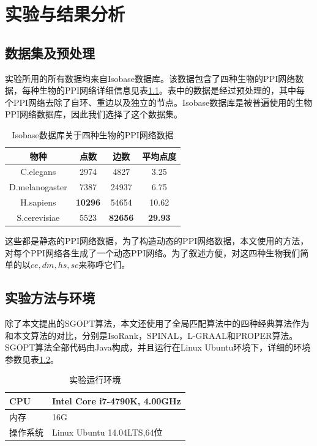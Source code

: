 \chapter{实验与结果分析}

\section{数据集及预处理}
实验所用的所有数据均来自Isobase数据库\cite{park2011isobase}。该数据包含了四种生物的PPI网络数据，每种生物的PPI网络详细信息见表\ref{table:1}。表中的数据是经过预处理的，其中每个PPI网络去除了自环、重边以及独立的节点。Isobase数据库是被普遍使用的生物PPI网络数据库，因此我们选择了这个数据集。


\begin{table}[htbp]
    \centering
    \caption{Isobase数据库关于四种生物的PPI网络数据}
    \label{table:1}
    \begin{tabular}{cccc}
         \hline 物种&点数&边数&平均点度\\
         \hline C.elegans&2974&4827&3.25\\
         D.melanogaster&7387&24937&6.75\\
         H.sapiens&\bf{10296}&54654&10.62\\
         S.cerevisiae&5523&\bf{82656}&\bf{29.93}\\
         \hline
    \end{tabular}
\end{table}

这些都是静态的PPI网络数据，为了构造动态的PPI网络数据，本文使用\cite{zhang2016method}的方法，对每个PPI网络各生成了一个动态PPI网络。为了叙述方便，对这四种生物我们简单的以$ce,dm,hs,sc$来称呼它们。

\section{实验方法与环境}
除了本文提出的SGOPT算法，本文还使用了全局匹配算法中的四种经典算法作为和本文算法的对比，分别是IsoRank\cite{singh2008global}，SPINAL\cite{aladaug2013spinal}，L-GRAAL\cite{malod2015graal}和PROPER\cite{kazemi2016proper}算法。SGOPT算法全部代码由Java构成，并且运行在Linux Ubuntu环境下，详细的环境参数见表\ref{table:2}。

\begin{table}[htbp]
    \centering
    \caption{实验运行环境}
    \label{table:2}
    \begin{tabular}{l|l}
         \hline 
         CPU&Intel Core i7-4790K, 4.00GHz\\
         \hline
         内存&16G\\
         \hline
         操作系统&Linux Ubuntu 14.04LTS,64位\\
         \hline
    \end{tabular}
\end{table}

